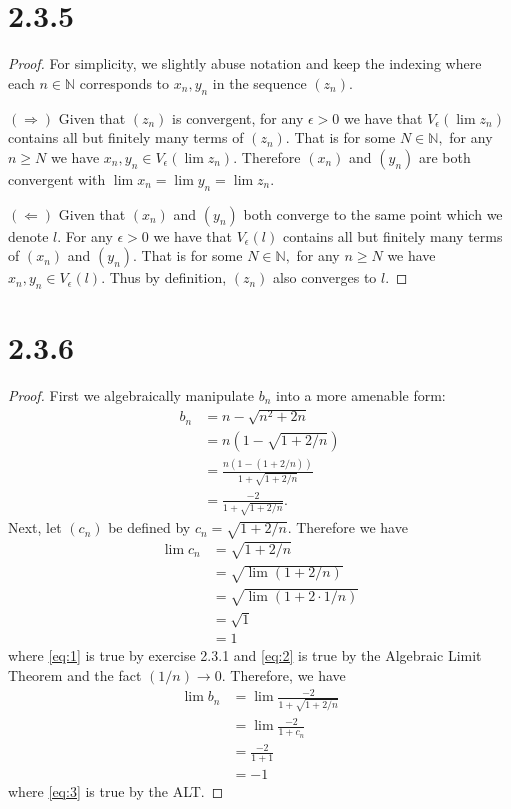 \documentclass[10pt]{article}
\begin{document}
\section*{2.3.5}
\begin{proof}
    For simplicity, we slightly abuse notation and keep the indexing where each $n\in\mathbb{N}$ corresponds to $x_n,y_n$ in the sequence $(z_n).$

    $(\Rightarrow)$ Given that $(z_n)$ is convergent, for any $\epsilon>0$ we have that $V_\epsilon(\lim z_n)$ contains all but finitely many terms of $(z_n).$ That is for some $N\in\mathbb{N},$ for any $n\ge N$ we have $x_n,y_n\in V_\epsilon(\lim z_n).$ Therefore $(x_n)$ and $(y_n)$ are both convergent with $\lim x_n = \lim y_n = \lim z_n.$

    $(\Leftarrow)$ Given that $(x_n)$ and $(y_n)$ both converge to the same point which we denote $l.$ For any $\epsilon>0$ we have that $V_\epsilon(l)$ contains all but finitely many terms of $(x_n)$ and $(y_n).$  That is for some $N\in\mathbb{N},$ for any $n\ge N$ we have $x_n,y_n\in V_\epsilon(l).$ Thus by definition, $(z_n)$ also converges to $l.$
\end{proof}

\section*{2.3.6}
\begin{proof}
    First we algebraically manipulate $b_n$ into a more amenable form:
    \begin{align*}
        b_n &= n-\sqrt{n^2+2n}\\
        &= n(1-\sqrt{1+2/n})\\
        &= \frac{n(1-(1+2/n))}{1+\sqrt{1+2/n}}\\
        &= \frac{-2}{1+\sqrt{1+2/n}}.
    \end{align*}
    Next, let $(c_n)$ be defined by $c_n = \sqrt{1+2/n}.$ Therefore we have
    \begin{align}
        \lim c_n &= \sqrt{1+2/n}\nonumber\\
        &= \sqrt{\lim (1 + 2/n)} \label{eq:1}\\
        &= \sqrt{\lim(1 + 2 \cdot 1/n)} \nonumber\\
        &= \sqrt{1} \label{eq:2}\\
        &= 1 \nonumber
    \end{align}
    where \eqref{eq:1} is true by exercise 2.3.1 and \eqref{eq:2} is true by the Algebraic Limit Theorem and the fact $(1/n)\to 0.$ Therefore, we have
    \begin{align}
        \lim b_n &= \lim \frac{-2}{1+\sqrt{1+2/n}} \nonumber\\
        &= \lim \frac{-2}{1+c_n} \nonumber\\
        &= \frac{-2}{1+1} \label{eq:3}\\
        &= -1 \nonumber
    \end{align}
    where \eqref{eq:3} is true by the ALT.
\end{proof}
\end{document}
